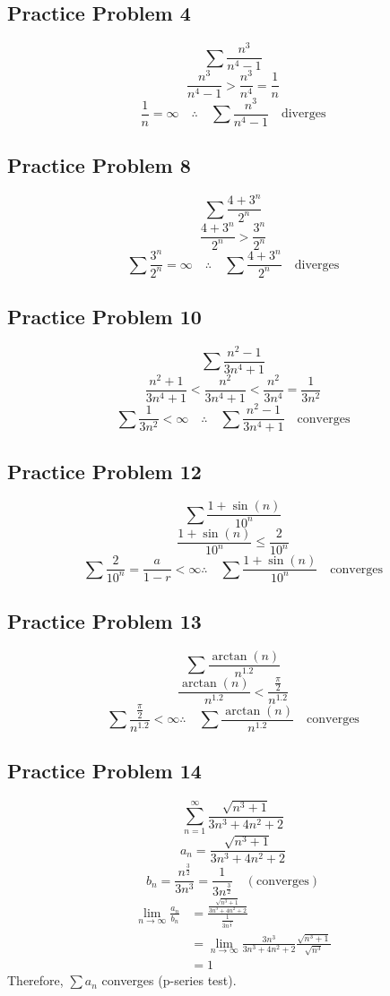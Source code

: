 \documentclass{math}
\begin{document}
\subsection*{Practice Problem 4}
\[ \sum\frac{n^{3}}{n^{4}-1} \]
\[ \frac{n^{3}}{n^{4}-1} > \frac{n^{3}}{n^{4}} = \frac{1}{n} \]
\[ \frac{1}{n} = \infty \quad \therefore \quad \sum\frac{n^{3}}{n^{4}-1}
   \quad \mathrm{diverges} \]

\subsection*{Practice Problem 8}
\[ \sum\frac{4+3^{n}}{2^{n}} \]
\[ \frac{4+3^{n}}{2^{n}} > \frac{3^{n}}{2^{n}} \]
\[ \sum\frac{3^{n}}{2^{n}} = \infty \quad \therefore \quad
   \sum\frac{4+3^{n}}{2^{n}} \quad \mathrm{diverges} \]

\subsection*{Practice Problem 10}
\[ \sum\frac{n^{2}-1}{3n^{4}+1} \]
\[ \frac{n^{2}+1}{3n^{4}+1} < \frac{n^{2}}{3n^{4}+1} < \frac{n^{2}}{3n^{4}} =
   \frac{1}{3n^{2}} \]
\[ \sum\frac{1}{3n^{2}} < \infty \quad \therefore \quad
   \sum\frac{n^{2}-1}{3n^{4}+1} \quad \mathrm{converges} \]

\subsection*{Practice Problem 12}
\[ \sum\frac{1+\sin(n)}{10^{n}} \]
\[ \frac{1+\sin(n)}{10^{n}} \leq \frac{2}{10^{n}} \]
\[ \sum\frac{2}{10^{n}} = \frac{a}{1-r} < \infty
   \therefore \quad \sum\frac{1+\sin(n)}{10^{n}} \quad \mathrm{converges} \]

\subsection*{Practice Problem 13}
\[ \sum\frac{\arctan(n)}{n^{1.2}} \]
\[ \frac{\arctan(n)}{n^{1.2}} < \frac{\frac{\pi}{2}}{n^{1.2}} \]
\[ \sum\frac{\frac{\pi}{2}}{n^{1.2}} < \infty
   \therefore \quad \sum\frac{\arctan(n)}{n^{1.2}} \quad \mathrm{converges} \]

\subsection*{Practice Problem 14}
\[ \sum_{n=1}^{\infty}\frac{\sqrt{n^{3}+1}}{3n^{3}+4n^{2}+2} \]
\[ a_{n} = \frac{\sqrt{n^{3}+1}}{3n^{3}+4n^{2}+2} \]
\[ b_{n} = \frac{n^{\frac{3}{2}}}{3n^{3}} = \frac{1}{3n^{\frac{3}{2}}}
   \quad \mathrm{(converges)} \]
\begin{align*}
  \lim_{n\to\infty}\frac{a_{n}}{b_{n}} &=
    \frac{\frac{\sqrt{n^{3}+1}}{3n^{3}+4n^{2}+2}}
    {\frac{1}{3n^{\frac{3}{2}}}} \\
  &= \lim_{n\to\infty}\frac{3n^{3}}{3n^{3}+4n^{2}+2}
    \frac{\sqrt{n^{3}+1}}{\sqrt{n^{3}}} \\
  &= 1
\end{align*}
Therefore, \( \sum{a_{n}} \) converges (p-series test).
\end{document}
